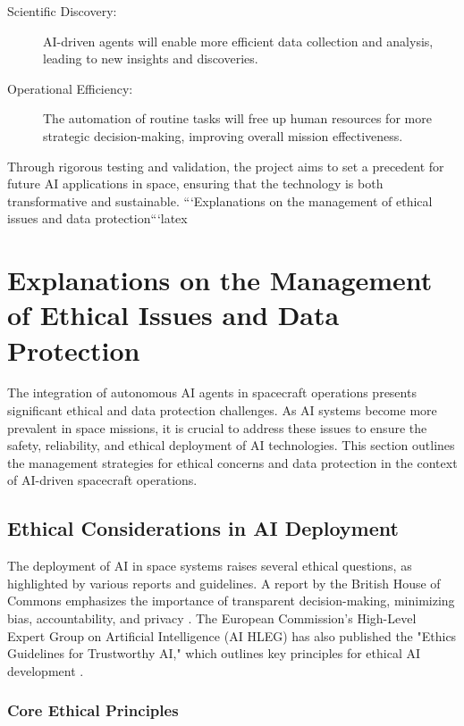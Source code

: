 \documentclass[a4paper, 11pt]{article}
\begin{document}
\begin{description}
    \item[Scientific Discovery:] AI-driven agents will enable more efficient data collection and analysis, leading to new insights and discoveries.
    \item[Operational Efficiency:] The automation of routine tasks will free up human resources for more strategic decision-making, improving overall mission effectiveness.
\end{description}

Through rigorous testing and validation, the project aims to set a precedent for future AI applications in space, ensuring that the technology is both transformative and sustainable.
```Explanations on the management of ethical issues and data protection```latex
\section{Explanations on the Management of Ethical Issues and Data Protection}

The integration of autonomous AI agents in spacecraft operations presents significant ethical and data protection challenges. As AI systems become more prevalent in space missions, it is crucial to address these issues to ensure the safety, reliability, and ethical deployment of AI technologies. This section outlines the management strategies for ethical concerns and data protection in the context of AI-driven spacecraft operations.

\subsection{Ethical Considerations in AI Deployment}

The deployment of AI in space systems raises several ethical questions, as highlighted by various reports and guidelines. A report by the British House of Commons emphasizes the importance of transparent decision-making, minimizing bias, accountability, and privacy \cite{house_of_commons_report}. The European Commission's High-Level Expert Group on Artificial Intelligence (AI HLEG) has also published the "Ethics Guidelines for Trustworthy AI," which outlines key principles for ethical AI development \cite{ai_hleg_guidelines}.

\subsubsection{Core Ethical Principles}
\end{document}
